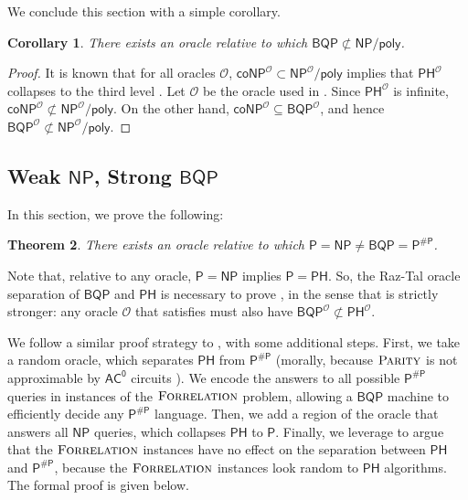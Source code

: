 \documentclass[10pt,a4paper]{article}
\newtheorem{theorem}{Theorem}
\newtheorem{corollary}[theorem]{Corollary}
\newcommand{\PARITY}{\normalfont\textsc{Parity}}
\newcommand{\Forrelation}{\normalfont\textsc{Forrelation}}
\begin{document}
We conclude this section with a simple corollary.

\begin{corollary}
\label{cor:bqp_not_in_np/poly}
There exists an oracle relative to which $\mathsf{BQP}\not \subset
\mathsf{NP/poly}$.
\end{corollary}

\begin{proof}
It is known that for all oracles $\mathcal{O}$, $\mathsf{coNP}^\mathcal{O}\subset\mathsf{NP}^\mathcal{O}/\mathsf{poly}$ implies that $\mathsf{PH}^\mathcal{O}$ collapses to the third level \cite{Yap83}. %
Let $\mathcal{O}$ be the oracle used in . Since $\mathsf{PH}^\mathcal{O}$ is infinite, $\mathsf{coNP}^\mathcal{O}\not\subset\mathsf{NP}^\mathcal{O}/\mathsf{poly}$. On the other hand, $\mathsf{coNP}^\mathcal{O}\subseteq\mathsf{BQP}^\mathcal{O}$, and hence $\mathsf{BQP}^\mathcal{O}\not\subset\mathsf{NP}^\mathcal{O}/\mathsf{poly}$.
\end{proof}

\subsection{Weak \texorpdfstring{$\mathsf{NP}$}{NP}, Strong \texorpdfstring{$\mathsf{BQP}$}{BQP}}

In this section, we prove the following:

\begin{theorem}
\label{thm:p=np_bqp=pp}
There exists an oracle relative to which $\mathsf{P}=\mathsf{NP}%
\neq\mathsf{BQP}=\mathsf{P}^{\mathsf{\#P}}$.
\end{theorem}

Note that, relative to any oracle, $\mathsf{P} = \mathsf{NP}$ implies $\mathsf{P} = \mathsf{PH}$. So, the Raz-Tal oracle separation of $\mathsf{BQP}$ and $\mathsf{PH}$ \cite{RT19} is necessary to prove , in the sense that  is strictly stronger: any oracle $\mathcal{O}$ that satisfies  must also have $\mathsf{BQP}^\mathcal{O} \not\subset \mathsf{PH}^\mathcal{O}$. 

We follow a similar proof strategy to , with some additional steps. First, we take a random oracle, which separates $\mathsf{PH}$ from $\mathsf{P}^\mathsf{\#P}$ (morally, because $\PARITY$ is not approximable by $\mathsf{AC^0}$ circuits \cite{Has87}). We encode the answers to all possible $\mathsf{P}^\mathsf{\# P}$ queries in instances of the $\Forrelation$ problem, allowing a $\mathsf{BQP}$ machine to efficiently decide any $\mathsf{P}^\mathsf{\# P}$ language. Then, we add a region of the oracle that answers all $\mathsf{NP}$ queries, which collapses $\mathsf{PH}$ to $\mathsf{P}$. Finally, we leverage  to argue that the $\Forrelation$ instances have no effect on the separation between $\mathsf{PH}$ and $\mathsf{P}^\mathsf{\#P}$, because the $\Forrelation$ instances look random to $\mathsf{PH}$ algorithms. The formal proof is given below.
\end{document}
